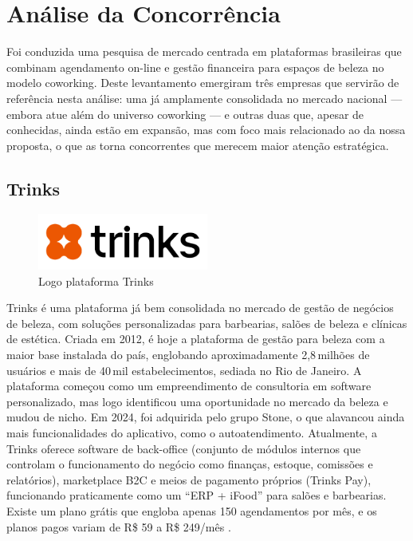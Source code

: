 \section{Análise da Concorrência}

Foi conduzida uma pesquisa de mercado centrada em plataformas brasileiras que combinam agendamento on-line e gestão financeira para espaços de beleza no modelo coworking. Deste levantamento emergiram três empresas que servirão de referência nesta análise: uma já amplamente consolidada no mercado nacional — embora atue além do universo coworking — e outras duas que, apesar de conhecidas, ainda estão em expansão, mas com foco mais relacionado ao da nossa proposta, o que as torna concorrentes que merecem maior atenção estratégica.

\subsection{Trinks}

\begin{figure}[htb]
	\centering
	\includegraphics[width=0.5\textwidth]{cap01-Introducao/Images/1.4.1_Trinks}
	\caption{Logo plataforma Trinks}
	\label{fig:Trinks}
\end{figure}

Trinks é uma plataforma já bem consolidada no mercado de gestão de negócios de beleza, com soluções
personalizadas para barbearias, salões de beleza e clínicas de estética. Criada em 2012, é hoje a
plataforma de gestão para beleza com a maior base instalada do país, englobando aproximadamente
2,8\,milhões de usuários e mais de 40\,mil estabelecimentos, sediada no Rio de Janeiro. A plataforma começou como um empreendimento de consultoria em software personalizado, mas logo identificou uma oportunidade no mercado da beleza e mudou de nicho. Em 2024, foi adquirida pelo grupo Stone, o que alavancou ainda mais funcionalidades do aplicativo, como o autoatendimento.
Atualmente, a Trinks oferece software de back-office (conjunto de módulos internos que controlam o funcionamento do negócio como finanças, estoque, comissões e relatórios), marketplace B2C e meios de pagamento próprios (Trinks Pay), funcionando praticamente como um “ERP + iFood” para salões e barbearias. Existe um
plano grátis que engloba apenas 150 agendamentos por mês, e os planos pagos variam de R\$ 59 a R\$ 249/mês \cite{Trinks}.

